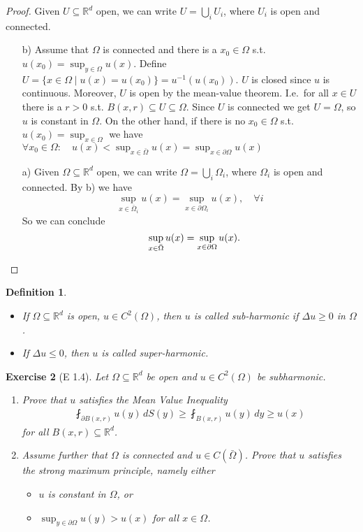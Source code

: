\documentclass{report}
\theoremstyle{tommy}
\newtheorem{defn}{Definition}
\newtheorem{ex}[defn]{Exercise}
\begin{document}
\begin{proof}
  Given \(U \subseteq \mathbb{R}^d\) open, we can write \(U = \bigcup_i U_i\), where \(U_i\) is open and connected.
  \begin{enumerate}
    \item[b)] Assume that \(\Omega\) is connected and there is a \(x_0 \in \Omega\) s.t. \(u(x_0) = \sup_{y \in \Omega} u(x)\). Define \(U = \{ x \in \Omega \mid u(x) = u(x_0)\} = u^{-1}(u(x_0))\). \(U\) is closed since \(u\) is continuous.
    Moreover, \(U\) is open by the mean-value theorem. I.e.~for all \(x \in U\) there is a \(r > 0\) s.t. \(B(x,r) \subseteq U \subseteq \Omega\).
    Since \(U\) is connected we get \(U = \Omega\), so \(u\) is constant in \(\Omega\). On the other hand, if there is no \(x_0 \in \Omega\) s.t. \(u(x_0) = \sup_{x \in \Omega}\) we have \(\forall x_0 \in \Omega: \quad u(x) < \sup_{x \in \bar \Omega} u(x) = \sup_{x \in \partial \Omega} u(x)\)
    \item[a)] Given \(\Omega \subseteq \mathbb{R}^d\) open, we can write \(\Omega = \bigcup_i \Omega_i\), where \(\Omega_i\) is open and connected. By b) we have
      \[\sup_{x \in \bar \Omega_i} u(x) = \sup_{x \in \partial \Omega_i} u(x), \quad \forall i\]
      So we can conclude
      \[\quad \sup_{x \in \bar \Omega} u(x) = \sup_{x \in \partial \Omega} u(x). \qedhere\]
  \end{enumerate}
\end{proof}

\begin{defn}
  \begin{itemize}
    \item If \(\Omega \subseteq \mathbb{R}^d\) is open, \(u \in C^2(\Omega)\), then \(u\) is called \emph{sub-harmonic} if \(\Delta u \ge 0\) in \(\Omega\).
    \item If \(\Delta u \le 0\), then \(u\) is called \emph{super-harmonic}.
  \end{itemize}
\end{defn}

\begin{ex}[E 1.4]
  Let \(\Omega \subseteq \mathbb{R}^d\) be open and \(u \in C^2(\Omega)\) be subharmonic.
  \begin{enumerate}[label=\alph*)]
    \item Prove that \(u\) satisfies the Mean Value Inequality
     \begin{align*}
       \fint_{\partial B(x, r)} u(y) \, dS(y)
       \ge \fint_{B(x, r)} u(y) \, dy
       \ge u(x)
     \end{align*}
     for all \(B(x,r) \subseteq \mathbb{R}^d\).
    \item Assume further that \(\Omega\) is connected and \(u \in C(\bar \Omega)\). Prove that \(u\) satisfies the strong maximum principle, namely either
    \begin{itemize}
      \item \(u\) is constant in \(\Omega\), or 
      \item \(\sup_{y \in \partial \Omega} u(y) > u(x)\) for all \(x \in \Omega\).
    \end{itemize}
  \end{enumerate}
\end{ex}
\end{document}
